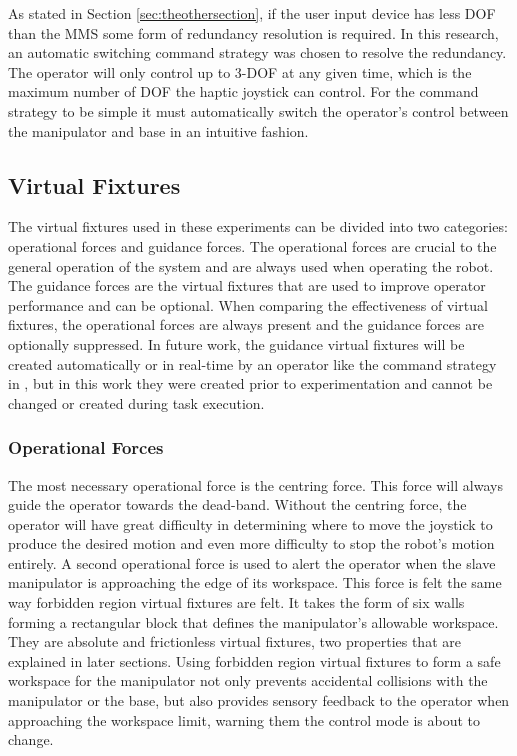 \documentclass[onecolumn,10pt,final]{asme2ej}
\begin{document}
As stated in Section \ref{sec:theothersection}, if the user input device has less DOF than the MMS some form of redundancy resolution is required. In this research, an automatic switching command strategy was chosen to resolve the redundancy. The operator will only control up to 3-DOF at any given time, which is the maximum number of DOF the haptic joystick can control. For the command strategy to be simple it must automatically switch the operator's control between the manipulator and base in an intuitive fashion.\\

\subsection{Virtual Fixtures}
\label{sec:bet}
The virtual fixtures used in these experiments can be divided into two categories: operational forces and guidance forces. The operational forces are crucial to the general operation of the system and are always used when operating the robot. The guidance forces are the virtual fixtures that are used to improve operator performance and can be optional. When comparing the effectiveness of virtual fixtures, the operational forces are always present and the guidance forces are optionally suppressed. In future work, the guidance virtual fixtures will be created automatically or in real-time by an operator like the command strategy in \cite{Last}, but in this work they were created prior to experimentation and cannot be changed or created during task execution.\\

\subsubsection{Operational Forces}

The most necessary operational force is the centring force. This force will always guide the operator towards the dead-band. Without the centring force, the operator will have great difficulty in determining where to move the joystick to produce the desired motion and even more difficulty to stop the robot's motion entirely. A second operational force is used to alert the operator when the slave manipulator is approaching the edge of its workspace. This force is felt the same way forbidden region virtual fixtures are felt. It takes the form of six walls forming a rectangular block that defines the manipulator's allowable workspace. They are absolute and frictionless virtual fixtures, two properties that are explained in later sections. Using forbidden region virtual fixtures to form a safe workspace for the manipulator not only prevents accidental collisions with the manipulator or the base, but also provides sensory feedback to the operator when approaching the workspace limit, warning them the control mode is about to change.\\
\end{document}
